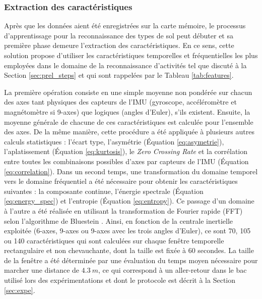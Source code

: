 \subsubsection{Extraction des caractéristiques}

Après que les données aient été enregistrées sur la carte mémoire, le processus d'apprentissage pour la reconnaissance des types de sol peut débuter et sa première phase demeure l'extraction des caractéristiques. En ce sens, cette solution propose d'utiliser les caractéristiques temporelles et fréquentielles les plus employées dans le domaine de la reconnaissance d'activités tel que discuté à la Section \ref{sec:prel_steps} et qui sont rappelées par le Tableau \ref{tab:features}.

La première opération consiste en une simple moyenne non pondérée sur chacun des axes tant \og{}physiques\fg{} des capteurs de l'\acs{IMU} (gyroscope, accéléromètre et magnétomètre si 9-axes) que \og{}logiques\fg{} (angles d'Euler), s'ils existent. Ensuite, la moyenne générale de chacune de ces caractéristiques est calculée pour l'ensemble des axes. De la même manière, cette procédure a été appliquée à plusieurs autres calculs statistiques : l'écart type, l'asymétrie (Équation \ref{eq:asymetrie}), l'aplatissement (Équation \ref{eq:kurtosis}), le \textit{Zero Crossing Rate} et la corrélation entre toutes les combinaisons possibles d'axes par capteurs de l'\acs{IMU} (Équation \ref{eq:correlation}). Dans un second temps, une transformation du domaine temporel vers le domaine fréquentiel a été nécessaire pour obtenir les caractéristiques suivantes : la composante continue, l'énergie spectrale (Équation \ref{eq:energy_spec}) et l'entropie  (Équation \ref{eq:entropy}). Ce passage d'un domaine à l'autre a été réalisée en utilisant la transformation de Fourier rapide (\acs{FFT}) selon l'algorithme de Bluestein \citep{Bluestein1970}. Ainsi, en fonction de la centrale inertielle exploitée (6-axes, 9-axes ou 9-axes avec les trois angles d'Euler), ce sont 70, 105 ou 140 caractéristiques qui sont calculées sur chaque fenêtre temporelle rectangulaire et non chevauchante, dont la taille est fixée à 60 secondes. La taille de la fenêtre a été déterminée par une évaluation du temps moyen nécessaire pour marcher une distance de $4.3\: m$, ce qui correspond à un aller-retour dans le bac utilisé lors des expérimentations et dont le protocole est décrit à la Section \ref{sec:expe}.

